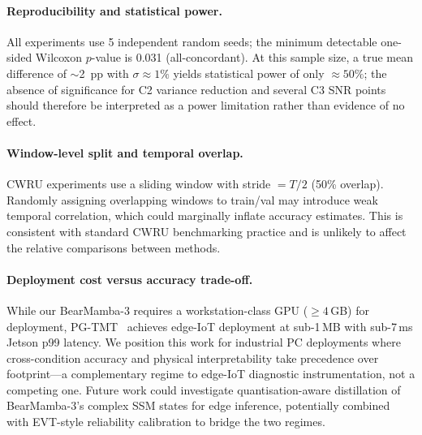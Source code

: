 \paragraph{Reproducibility and statistical power.}
All experiments use 5 independent random seeds; the minimum detectable
one-sided Wilcoxon $p$-value is 0.031 (all-concordant).
At this sample size, a true mean difference of $\sim$2~pp with
$\sigma \approx 1\%$ yields statistical power of only $\approx 50\%$;
the absence of significance for C2 variance reduction and several
C3 SNR points should therefore be interpreted as a power limitation
rather than evidence of no effect.

\paragraph{Window-level split and temporal overlap.}
CWRU experiments use a sliding window with stride $= T/2$ (50\% overlap).
Randomly assigning overlapping windows to train/val may introduce weak
temporal correlation, which could marginally inflate accuracy estimates.
This is consistent with standard CWRU benchmarking practice and is
unlikely to affect the relative comparisons between methods.

\paragraph{Deployment cost versus accuracy trade-off.}
While our BearMamba-3 requires a workstation-class GPU ($\geq 4$\,GB)
for deployment, PG-TMT~\cite{li2026pgtmt} achieves edge-IoT deployment
at sub-1\,MB with sub-7\,ms Jetson p99 latency.
We position this work for industrial PC deployments where cross-condition
accuracy and physical interpretability take precedence over
footprint---a complementary regime to edge-IoT diagnostic instrumentation,
not a competing one.
Future work could investigate quantisation-aware distillation of
BearMamba-3's complex SSM states for edge inference, potentially combined
with EVT-style reliability calibration to bridge the two regimes.
